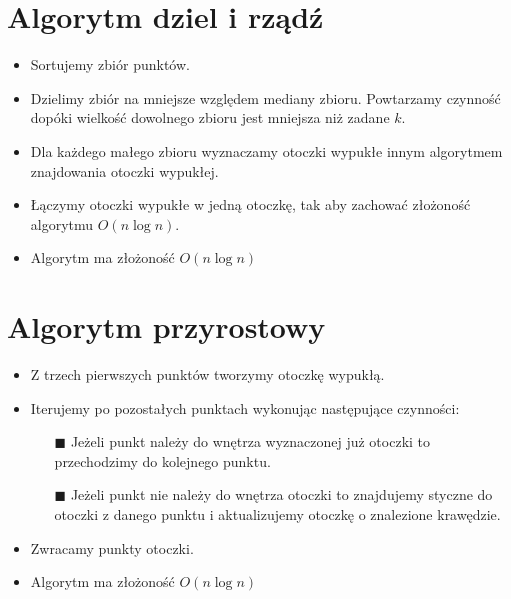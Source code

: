\documentclass[12pt]{article}
\begin{document}
\section{Algorytm dziel i rządź}
\begin{itemize}
\item Sortujemy zbiór punktów.
\item Dzielimy zbiór na mniejsze względem mediany zbioru. Powtarzamy czynność dopóki wielkość dowolnego zbioru jest mniejsza niż zadane $k$.
\item Dla każdego małego zbioru wyznaczamy otoczki wypukłe innym algorytmem znajdowania otoczki wypukłej.
\item Łączymy otoczki wypukłe w jedną otoczkę, tak aby zachować złożoność algorytmu $O(n \log n)$.
\item Algorytm ma złożoność $O(n\log n)$
\end{itemize}
\newpage
\section{Algorytm przyrostowy}
\begin{itemize}
\item Z trzech pierwszych punktów tworzymy otoczkę wypukłą.
\item Iterujemy po pozostałych punktach wykonując następujące czynności:
\begin{itemize}
\item[$\blacksquare$] Jeżeli punkt należy do wnętrza wyznaczonej już otoczki to przechodzimy do kolejnego punktu.
\item[$\blacksquare$] Jeżeli punkt nie należy do wnętrza otoczki to znajdujemy styczne do otoczki z danego punktu i aktualizujemy otoczkę o znalezione krawędzie.
\end{itemize}
\item Zwracamy punkty otoczki.
\item Algorytm ma złożoność $O(n\log n)$
\end{itemize}
\newpage
\end{document}
